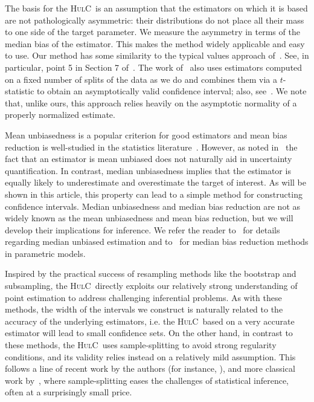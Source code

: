 \documentclass{article}
\newcommand{\hulc}{\textsc{HulC}~}
\numberwithin{myalgctr}{section}
\begin{document}
The basis for the \hulc is an assumption that
the estimators on which it is based are not
pathologically asymmetric: their distributions do not place all their
mass to one side of the target parameter.
We measure the asymmetry in terms of the median bias of
the estimator. This makes the method widely
applicable and easy to use. 
Our method has some similarity to the typical values
approach of~\cite{hartigan1969using,hartigan1970exact}. See, in
particular, point 5 in Section 7 of~\cite{hartigan1970exact}.
{\color{black}The work of~\citet{Ibragimov2010} also uses estimators computed on a fixed number of splits of the data as we do and combines them via a $t$-statistic to obtain an asymptotically valid confidence interval; also, see~\cite{lam2022cheap}. We note that, unlike ours, this approach relies heavily on the asymptotic normality of a properly normalized estimate.}



Mean unbiasedness is a popular criterion for good estimators and mean bias reduction is well-studied in the statistics literature~\citep{firth1993bias,kosmidis2009bias,kim2016higher}. However, as noted in~\cite{pfanzagl2017optimality} the fact that an estimator is mean unbiased does not naturally aid in uncertainty quantification.
In contrast, median unbiasedness implies that the estimator is equally likely to underestimate and overestimate the target of interest. As will be shown in this article, this property can lead to a simple method for constructing confidence intervals. Median unbiasedness and median bias reduction are not as widely known as the mean unbiasedness and mean bias reduction, but we will develop their implications for inference. We refer the reader to~\cite{pfanzagl2011parametric} for details regarding median unbiased estimation and to~\cite{kenne2017median,kosmidis2020mean} for median bias reduction methods {\color{black}in parametric models}. 

Inspired by the practical success of resampling methods like the bootstrap and subsampling, the \hulc directly exploits our relatively strong understanding of point estimation to address challenging inferential problems.
As with these methods, the width of the intervals we construct is naturally related to the accuracy of the underlying estimators, i.e. the \hulc based on a very accurate estimator will lead to small confidence sets. On the other hand, in contrast to 
these methods, the \hulc uses sample-splitting to avoid strong regularity conditions, and its validity relies instead on a relatively mild assumption. This follows a line of recent work by the authors
(for instance, \cite{wasserman2020universal,chakravarti2019gaussian,rinaldo2019bootstrapping}), and more classical work by~\cite{bickel1982adaptive}, where sample-splitting eases the challenges of statistical inference, often at a surprisingly small price. 
\end{document}
